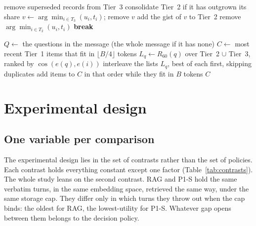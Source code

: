 \begin{algorithm}[htbp]
\caption{\textsc{EnforceBudget}(): hold the store at or below $S$}
\label{alg:budget}
\begin{algorithmic}[1]
\State remove superseded records from Tier~3
\State consolidate Tier~2 if it has outgrown its share
 
     \State $v \gets \arg\min_{i\in T_3} (u_i, t_i)$; remove $v$ 
        \State add the gist of $v$ to Tier~2
     \EndIf
     \State remove $\arg\min_{i\in T_2} (u_i, t_i)$
  \Else
     \State \textbf{break} 
  \EndIf
\EndWhile
\end{algorithmic}
\end{algorithm}

\begin{algorithm}[htbp]
\caption{Read path: \textsc{BuildContext}$(\text{message}, B)$}
\label{alg:context}
\begin{algorithmic}[1]
\State $Q \gets$ the questions in the message (the whole message if it has none)
\State $C \gets$ most recent Tier~1 items that fit in $\lfloor B/4 \rfloor$ tokens
  \State $L_q \gets R_{60}(q)$ over Tier~2 $\cup$ Tier~3, ranked by $\cos(e(q), e(i))$ 
\EndFor
\State interleave the lists $L_q$, best of each first, skipping duplicates
\State add items to $C$ in that order while they fit in $B$ tokens
\State \Return $C$ 
\end{algorithmic}
\end{algorithm}

\section{Experimental design}

\subsection{One variable per comparison}
The experimental design lies in the set of contrasts rather than the set of
policies. Each contrast holds everything constant except one factor
(Table~\ref{tab:contrasts}). The whole study leans on the second contrast. RAG
and P1-S hold the same verbatim turns, in the same embedding space, retrieved
the same way, under the same storage cap. They differ only in which turns they
throw out when the cap binds: the oldest for RAG, the lowest-utility for P1-S.
Whatever gap opens between them belongs to the decision policy.

